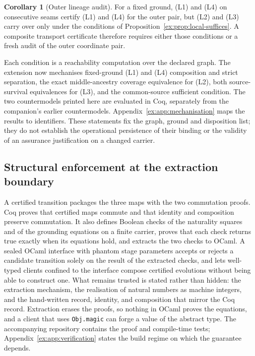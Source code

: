 \documentclass[11pt]{article}
\theoremstyle{definition}
\newtheorem{corollary}[proposition]{Corollary}
\newcommand{\code}[1]{\texttt{#1}}
\begin{document}
\begin{corollary}[Outer lineage audit]\label{ex:cor:fresh-outer-audit}
For a fixed ground, (L1) and (L4) on consecutive seams certify (L1) and (L4) for the outer pair, but (L2) and (L3) carry over only under the conditions of Proposition~\ref{ex:prop:local-suffices}. A composite transport certificate therefore requires either those conditions or a fresh audit of the outer coordinate pair.
\end{corollary}

Each condition is a reachability computation over the declared graph. The extension now mechanises fixed-ground (L1) and (L4) composition and strict separation, the exact middle-ancestry coverage equivalence for (L2), both source-survival equivalences for (L3), and the common-source sufficient condition. The two countermodels printed here are evaluated in Coq, separately from the companion's earlier countermodels. Appendix~\ref{ex:app:mechanisation} maps the results to identifiers. These statements fix the graph, ground and disposition list; they do not establish the operational persistence of their binding or the validity of an assurance justification on a changed carrier.

\subsection{Structural enforcement at the extraction boundary}\label{ex:sec:structural-enforcement}

A certified transition packages the three maps with the two commutation proofs. Coq proves that certified maps commute and that identity and composition preserve commutation. It also defines Boolean checks of the naturality squares and of the grounding equations on a finite carrier, proves that each check returns true exactly when its equations hold, and extracts the two checks to OCaml. A sealed OCaml interface with phantom stage parameters accepts or rejects a candidate transition solely on the result of the extracted checks, and lets well-typed clients confined to the interface compose certified evolutions without being able to construct one. What remains trusted is stated rather than hidden: the extraction mechanism, the realisation of natural numbers as machine integers, and the hand-written record, identity, and composition that mirror the Coq record. Extraction erases the proofs, so nothing in OCaml proves the equations, and a client that uses \code{Obj.magic} can forge a value of the abstract type. The accompanying repository contains the proof and compile-time tests; Appendix~\ref{ex:app:verification} states the build regime on which the guarantee depends.
\end{document}
